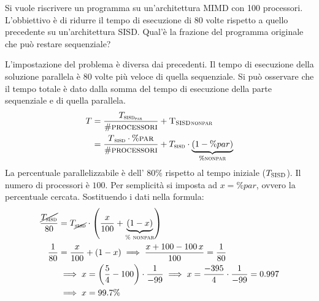 \begin{exercise}
	Si vuole riscrivere un programma su un'architettura MIMD con 100 processori. L'obbiettivo è di ridurre il tempo di esecuzione di 80 volte rispetto a quello precedente su un'architettura SISD. Qual'è la frazione del programma originale che può restare sequenziale?
\end{exercise}
\begin{solution}
	L'impostazione del problema è diversa dai precedenti. Il tempo di esecuzione della soluzione parallela è 80 volte più veloce di quella sequenziale. Si può osservare che il tempo totale è dato dalla somma del tempo di esecuzione della parte sequenziale e di quella parallela.
	\begin{align*}
		T&=\frac{T_{\textsc{sisd\textsubscript{\textsc{par}}}}}{\#\textsc{processori}}+\textsc{T\textsubscript{SISD}\textsubscript{\textsc{nonpar}}}\\
		&=\frac{T\textsubscript{\textsc{sisd}}\cdot \%\textsc{par}}{\#\textsc{processori}}+T_\textsc{sisd}\cdot\underbrace{ (1-\% par) }_{\%\textsc{nonpar}}
	\end{align*}
	La percentuale parallelizzabile è dell' $80\%$ rispetto al tempo iniziale ($T_\textsc{SISD}$).  Il numero di processori è $100$. Per semplicità si imposta ad $x=\% par$, ovvero la percentuale cercata.
	Sostituendo i dati nella formula:
	\begin{align*}
		\frac{\cancel{T_\textsc{sisd}}}{80}&=T_{\cancel{\textsc{sisd}}}\cdot \left(\frac{x}{100}+\underbrace{(1-x)}_{\textsc{\% nonpar}}\right)\\
		\frac{1}{80} &=  \frac{x}{100} + (1-x)\implies \frac{x+100-100\, x}{100}=\frac{1}{80}
		 \\ &\implies x = \left(\frac{5}{4}-100\right)\cdot\frac{1}{-99}\implies x = \frac{-395}{4}\cdot \frac{1}{-99}=0.997\\ &\implies x = 99.7\%
	\end{align*}
\end{solution}

